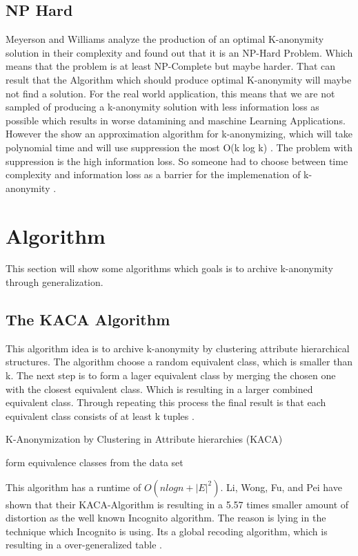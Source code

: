 \documentclass{llncs}
\begin{document}
\subsection{NP Hard}
Meyerson and Williams analyze the production of an optimal K-anonymity solution in their complexity and found out that it is an NP-Hard Problem. Which means that the problem is at least NP-Complete but maybe harder. That can result that the Algorithm which should produce optimal K-anonymity will maybe not find a solution. For the real world application, this means that we are not sampled of producing a k-anonymity solution with less information loss as possible which results in worse datamining and maschine Learning Applications.  However the show an approximation algorithm for k-anonymizing, which will take polynomial time and will use suppression the most O(k log k)  \cite{sweeney2002k}. The problem with suppression is the high information loss. So someone had to choose between time complexity and information loss as a barrier for the implemenation of k-anonymity \cite{el2009globally}. 



\section{Algorithm}
This section will show some algorithms which goals is to archive k-anonymity through generalization. 

\subsection{The KACA Algorithm}
This algorithm idea is to archive k-anonymity by clustering attribute hierarchical structures. The algorithm choose a random equivalent class, which is smaller than k. The next step is to form a lager equivalent class by merging the chosen  one with the closest equivalent class. Which is resulting in a larger combined equivalent class. Through repeating this process the final result is that each equivalent class consists of at least k tuples  \cite{li2006achieving}.\\
\begin{algorithm}[H]
	\caption{K-Anonymization by Clustering in Attribute hierarchies (KACA) \cite{li2006achieving}}
	form equivalence classes from the data set\\
\end{algorithm}
This algorithm has a runtime of $O(nlogn + |E|^{2})$. Li, Wong, Fu, and Pei have shown that their KACA-Algorithm is resulting in a 5.57 times smaller amount of distortion as the well known Incognito algorithm. The reason is lying in the technique which Incognito is using. Its a global recoding algorithm, which is resulting in a over-generalized table \cite{li2006achieving}.
\end{document}
